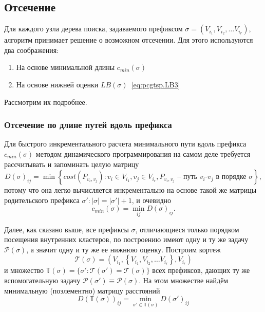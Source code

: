 
\subsection{Отсечение}
\label{sec:pgstcp.cut}

Для каждого узла дерева поиска,
задаваемого префиксом
$\sigma=(V_{i_1}, V_{i_2}, \dots V_{i_r})$,
алгоритм принимает решение
о возможном отсечении.
Для этого используются два соображения:

\begin{enumerate}
  \item На основе минимальной длины $c_{min}(\sigma)$
  \item На основе нижней оценки $LB(\sigma)$~\eqref{eq:pcgtsp.LB3}
\end{enumerate}

Рассмотрим их подробнее.

\subsubsection{Отсечение по длине путей вдоль префикса}

Для быстрого инкрементального расчета
минимального пути вдоль префикса
$c_{min}(\sigma)$
методом динамического программирования
на самом деле требуется рассчитывать
и запоминать целую матрицу
\begin{equation}
  \label{eq:pcgtsp.cut.matrix}
D(\sigma)_{ij} = \min\left\{
  cost(P_{v_i,v_j})\colon
  v_i \in V_{i_1},
  v_j \in V_{i_r},
  P_{v_i,v_j} \text{ -- путь $v_i$-$v_j$ в порядке } \sigma
\right\}
,
\end{equation}
потому что она легко вычисляется
инкрементально на основе такой же матрицы
родительского префикса $\sigma': |\sigma| = |\sigma'|+1$,
и очевидно
\begin{equation}
  \label{eq.pcgtsp.c_min.dp}
  c_{min}(\sigma) = \min_{ij} D(\sigma)_{ij}
  .
\end{equation}

Далее, как сказано выше,
все префиксы $\sigma$,
отличающиеся только порядком
посещения внутренних кластеров,
по построению имеют одну и ту же задачу
$\mathcal P(\sigma)$,
а значит одну и ту же ее нижнюю оценку.
Построим кортеж
\begin{equation}
  \label{eq:pcgtsp.cut.key}
  \mathcal T(\sigma) = (V_{i_1},
  \left\{V_{i_1}, V_{i_2}, \dots V_{i_r} \right\}, V_{i_r})
\end{equation}
и множество
$
\mathbb T(\sigma) =\{\sigma' \colon \mathcal T(\sigma')=\mathcal T(\sigma)\}$
всех префиксов,
дающих ту же вспомогательную задачу
$\mathcal P(\sigma')\equiv \mathcal P(\sigma)$.
На этом множестве найдём минимальную
(поэлементно)
матрицу расстояний
$$
D(\mathbb T(\sigma))_{ij} =
  \min_{\sigma' \in \mathbb T(\sigma)} D(\sigma')_{ij}
$$

